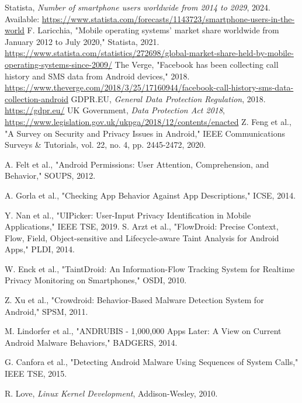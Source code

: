 \documentclass[a4paper,12pt]{report}
\begin{document}
\begin{thebibliography}{99}
     Statista, \textit{Number of smartphone users worldwide from 2014 to 2029}, 2024. Available: \url{https://www.statista.com/forecasts/1143723/smartphone-users-in-the-world}
     F. Laricchia, "Mobile operating systems’ market share worldwide from January 2012 to July 2020," Statista, 2021. \url{https://www.statista.com/statistics/272698/global-market-share-held-by-mobile-operating-systems-since-2009/}
     The Verge, "Facebook has been collecting call history and SMS data from Android devices," 2018. \url{https://www.theverge.com/2018/3/25/17160944/facebook-call-history-sms-data-collection-android}
     GDPR.EU, \textit{General Data Protection Regulation}, 2018. \url{https://gdpr.eu/}
     UK Government, \textit{Data Protection Act 2018}, \url{https://www.legislation.gov.uk/ukpga/2018/12/contents/enacted}
     Z. Feng et al., "A Survey on Security and Privacy Issues in Android," IEEE Communications Surveys \& Tutorials, vol. 22, no. 4, pp. 2445-2472, 2020.

     A. Felt et al., "Android Permissions: User Attention, Comprehension, and Behavior," SOUPS, 2012.

     A. Gorla et al., "Checking App Behavior Against App Descriptions," ICSE, 2014.

     Y. Nan et al., "UIPicker: User-Input Privacy Identification in Mobile Applications," IEEE TSE, 2019.
     S. Arzt et al., "FlowDroid: Precise Context, Flow, Field, Object-sensitive and Lifecycle-aware Taint Analysis for Android Apps," PLDI, 2014.

     W. Enck et al., "TaintDroid: An Information-Flow Tracking System for Realtime Privacy Monitoring on Smartphones," OSDI, 2010.

     Z. Xu et al., "Crowdroid: Behavior-Based Malware Detection System for Android," SPSM, 2011.

     M. Lindorfer et al., "ANDRUBIS - 1,000,000 Apps Later: A View on Current Android Malware Behaviors," BADGERS, 2014.

     G. Canfora et al., "Detecting Android Malware Using Sequences of System Calls," IEEE TSE, 2015.

     R. Love, \textit{Linux Kernel Development}, Addison-Wesley, 2010.


\end{thebibliography}
\end{document}
